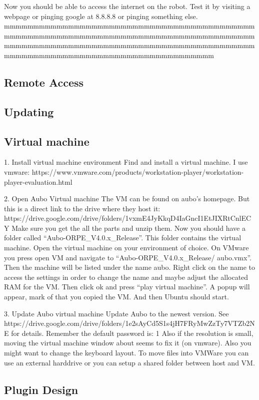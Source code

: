 \documentclass{article}
\begin{document}
Now you should be able to access the internet on the robot. Test it by visiting a webpage or pinging google at 8.8.8.8 or pinging something else.  mmmmmmmmmmmmmmmmmmmmmmmmmmmmmmmmmmmmmmmmmmmmmmmmmmmmmmmmmmmmmmmmmmmmmmmmmmmmmmmmmmmmmmmmmmmmmmmmmmmmmmmmmmmmmmmmmmmmmmmmmmmmmmmmmmmmmmmmmmmmmmmmmmmmmmmmmmmmmmmmmmmmm 

\subsection{Remote Access}
\subsection{Updating}
\subsection{Virtual machine}
\label{sec:virtual}

1.	Install virtual machine environment
Find and install a virtual machine. I use vmware: https://www.vmware.com/products/workstation-player/workstation-player-evaluation.html

2.	Open Aubo Virtual machine
The VM can be found on aubo’s homepage. But this is a direct link to the drive where they host it:  https://drive.google.com/drive/folders/1vxmE4JyKkqD4IaGncI1EtJIXRtCnlECY 
Make sure you get the all the parts and unzip them. Now you should have a folder called “Aubo-ORPE_V4.0.x_Release”. This folder contains the virtual machine. 
Open the virtual machine on your environment of choice. 
On VMware you press open VM and navigate to “Aubo-ORPE_V4.0.x_Release/ aubo.vmx”. Then the machine will be listed under the name aubo. Right click on the name to access the settings in order to change the name and maybe adjust the allocated RAM for the VM. Then click ok and press “play virtual machine”.  A popup will appear, mark of that you copied the VM. And then Ubuntu should start. 

3.	Update Aubo virtual machine
Update Aubo to the newest version. See https://drive.google.com/drive/folders/1e2sAyCd5S1s4jH7FRyMwZzTy7VTZb2NE for details. 
Remember the default password is: 1 
Also if the resolution is small, moving the virtual machine window about seems to fix it (on vmware). 
Also you might want to change the keyboard layout. 
To move files into VMWare you can use an external harddrive or you can setup a shared folder between host and VM.

\subsection{Plugin Design}
\end{document}

